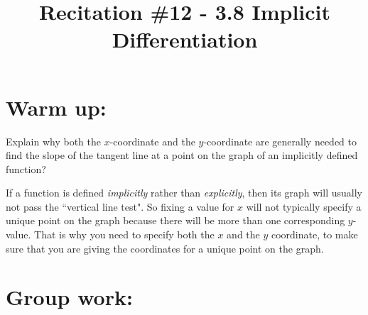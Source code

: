 \documentclass[handout,nooutcomes]{ximera}
\title{Recitation \#12 - 3.8 Implicit Differentiation}
\begin{document}
\begin{abstract}		\end{abstract}
\maketitle

\section*{Warm up:} 
Explain why both the $x$-coordinate and the $y$-coordinate are generally needed to find the slope of the tangent line at a point on the graph of an implicitly defined function?
	\begin{freeResponse}
	If a function is defined \emph{implicitly} rather than \emph{explicitly}, then its graph will usually not pass the ``vertical line test".  So fixing a value for $x$ will not typically specify a unique point on the graph because there will be more than one corresponding $y$-value.  That is why you need to specify both the $x$ and the $y$ coordinate, to make sure that you are giving the coordinates for a unique point on the graph.
	\end{freeResponse}	
	
	
	
	
	

\section*{Group work:}
\end{document}
